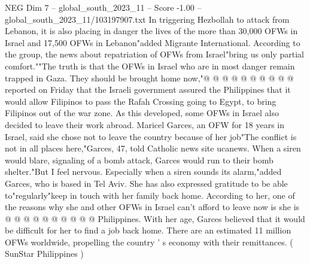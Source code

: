 \begin{textsample}{NEG Dim 7 – global\_south\_2023\_11 – Score -1.00 – global\_south\_2023\_11/103197907.txt}
In triggering Hezbollah to attack from Lebanon, it is also placing in danger the lives of the more than 30,000 OFWs in Israel and 17,500 OFWs in Lebanon"added Migrante International.
According to the group, the news about repatriation of OFWs from Israel"bring us only partial comfort.""The truth is that the OFWs in Israel who are in most danger remain trapped in Gaza.
They should be brought home now,"@ @ @ @ @ @ @ @ @ @ reported on Friday that the Israeli government assured the Philippines that it would allow Filipinos to pass the Rafah Crossing going to Egypt, to bring Filipinos out of the war zone.
As this developed, some OFWs in Israel also decided to leave their work abroad.
Maricel Garces, an OFW for 18 years in Israel, said she chose not to leave the country because of her job"The conflict is not in all places here,"Garces, 47, told Catholic news site ucanews.
When a siren would blare, signaling of a bomb attack, Garces would run to their bomb shelter."But I feel nervous.
Especially when a siren sounds its alarm,"added Garces, who is based in Tel Aviv.
She has also expressed gratitude to be able to"regularly"keep in touch with her family back home.
According to her, one of the reasons why she and other OFWs in Israel can't afford to leave now is she is @ @ @ @ @ @ @ @ @ @ Philippines.
With her age, Garces believed that it would be difficult for her to find a job back home.
There are an estimated 11 million OFWs worldwide, propelling the country ' s economy with their remittances. ( SunStar Philippines )

\end{textsample}
